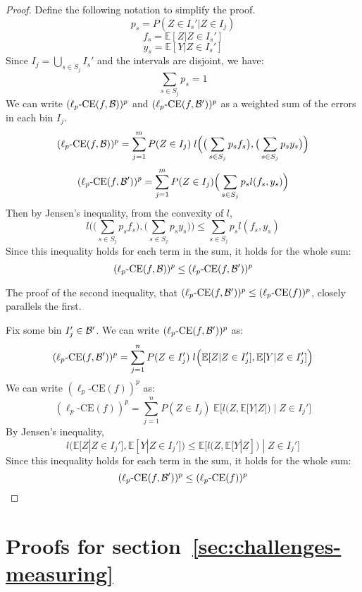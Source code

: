 \begin{proof}
Define the following notation to simplify the proof.
\[ p_s = P(Z \in I_s' | Z \in I_j) \]
\[ f_s = \mathbb{E}[Z | Z \in I_s']\]
\[ y_s = \mathbb{E}[Y | Z \in I_s']\]
Since $I_j = \bigcup_{s \in S_j} I_s'$ and the intervals are disjoint, we have:
\[ \sum_{s \in S_j} p_s = 1 \]
We can write $(\ell_p\mbox{-CE}(f, \mathcal{B}{}))^p$ and $(\ell_p\mbox{-CE}(f, \mathcal{B}{}'))^p$ as a weighted sum of the errors in each bin $I_j$.
\[ (\ell_p\mbox{-CE}(f, \mathcal{B}{}))^p = \sum_{j=1}^m P(Z \in I_j) \; l\Big( \big( \sum_{s \in S_j} p_s f_s \big), \big( \sum_{s \in S_j} p_s y_s \big) \Big) \]
\[ (\ell_p\mbox{-CE}(f, \mathcal{B}{}'))^p = \sum_{j=1}^m P(Z \in I_j) \Big( \sum_{s \in S_j} p_s l(f_s, y_s) \Big) \]
Then by Jensen's inequality, from the convexity of $l$,
\[ l\Big( \big( \sum_{s \in S_j} p_s f_s \big), \big( \sum_{s \in S_j} p_s y_s \big) \Big) \leq \sum_{s \in S_j} p_s l(f_s, y_s)  \]
Since this inequality holds for each term in the sum, it holds for the whole sum:
\[ (\ell_p\mbox{-CE}(f, \mathcal{B}{}))^p \leq (\ell_p\mbox{-CE}(f, \mathcal{B}{}'))^p \]

The proof of the second inequality, that $(\ell_p\mbox{-CE}(f, \mathcal{B}{}'))^p \leq (\ell_p\mbox{-CE}(f))^p$, closely parallels the first.

Fix some bin $I_j' \in \mathcal{B}{}'$. We can write $(\ell_p\mbox{-CE}(f, \mathcal{B}{}'))^p$ as:
\[ (\ell_p\mbox{-CE}(f, \mathcal{B}{}'))^p = \sum_{j=1}^n P(Z \in I_j') \; l\Big( \mathbb{E}[Z | Z \in I_j'], \mathbb{E}[Y | Z \in I_j'] \Big) \]
We can write $(\ell_p\mbox{-CE}(f))^p$ as:
\[ (\ell_p\mbox{-CE}(f))^p = \sum_{j=1}^n P(Z \in I_j) \; \mathbb{E}\Big[ l\big( Z, \mathbb{E}[Y | Z] \big) \; | \; Z \in I_j' \Big] \]
By Jensen's inequality,
\[ l\Big( \mathbb{E}[Z | Z \in I_j'], \mathbb{E}[Y | Z \in I_j'] \Big) \leq \mathbb{E}\Big[ l\big( Z, \mathbb{E}[Y | Z] \big) \; | \; Z \in I_j' \Big] \]
Since this inequality holds for each term in the sum, it holds for the whole sum:
\[ (\ell_p\mbox{-CE}(f, \mathcal{B}{}'))^p \leq (\ell_p\mbox{-CE}(f))^p \]
\end{proof}





\section{Proofs for section~\ref{sec:challenges-measuring}}

































